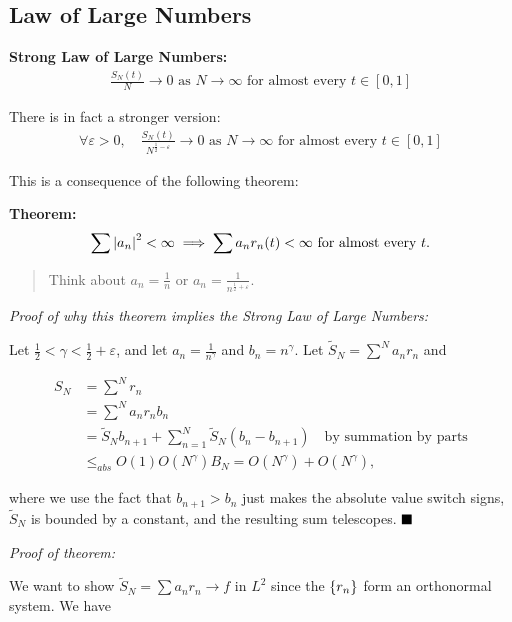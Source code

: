\hypertarget{law-of-large-numbers}{%
\subsection{Law of Large Numbers}\label{law-of-large-numbers}}

\textbf{Strong Law of Large Numbers:}
\begin{align*}
\frac{S_N(t)}{N} \to 0 \text{ as } N\to \infty \text{ for almost every } t\in [0, 1]
\end{align*}

There is in fact a stronger version:
\begin{align*}
\forall \varepsilon > 0,\quad \frac{S_N(t)}{N^{\frac 1 2 - \varepsilon }} \to 0 \text{ as } N\to \infty \text{ for almost every } t\in [0, 1]
\end{align*}

This is a consequence of the following theorem:

\textbf{Theorem:}
\begin{align*}
\sum {\left\lvert {a_n} \right\rvert}^2 < \infty \implies \sum a_n r_n(t) < \infty \text{ for almost every } t
.\end{align*}

\begin{quote}
Think about \(a_n = \frac 1 n\) or
\(a_n = \frac 1 {n^{\frac 1 2 + \varepsilon }}\).
\end{quote}

\emph{Proof of why this theorem implies the Strong Law of Large
Numbers:}

Let \(\frac 1 2 < \gamma < \frac 1 2 + \varepsilon\), and let
\(a_n = \frac 1 {n^\gamma}\) and \(b_n = n^\gamma\). Let
\(\tilde S_N = \sum^N a_n r_n\) and

\begin{align*}
S_N 
&= \sum^N r_n \\
&= \sum^N a_n r_n b_n \\
&= \tilde S_N b_{n+1} + \sum_{n=1}^N \tilde S_N (b_n - b_{n+1}) \quad \text{by summation by parts} \\
&\leq_{abs} O(1) O(N^\gamma) B_N = O(N^\gamma) + O(N^\gamma)
,\end{align*}

where we use the fact that \(b_{n+1} > b_n\) just makes the absolute
value switch signs, \(\tilde S_N\) is bounded by a constant, and the
resulting sum telescopes. \(\qed\)

\emph{Proof of theorem:}

We want to show \(\tilde S_N = \sum a_n r_n \to f\) in \(L^2\) since the
\(\left\{{r_n}\right\}\) form an orthonormal system. We have

